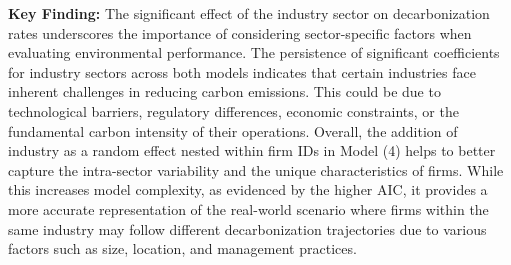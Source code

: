\textbf{Key Finding:} The significant effect of the industry sector on decarbonization rates underscores the importance of considering sector-specific factors when evaluating environmental performance. The persistence of significant coefficients for industry sectors across both models indicates that certain industries face inherent challenges in reducing carbon emissions. This could be due to technological barriers, regulatory differences, economic constraints, or the fundamental carbon intensity of their operations. Overall, the addition of industry as a random effect nested within firm IDs in Model (4) helps to better capture the intra-sector variability and the unique characteristics of firms. While this increases model complexity, as evidenced by the higher AIC, it provides a more accurate representation of the real-world scenario where firms within the same industry may follow different decarbonization trajectories due to various factors such as size, location, and management practices.
    


